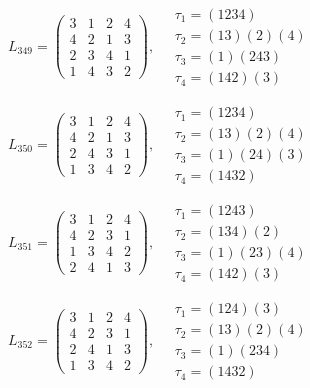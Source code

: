 $L_{349} = \begin{pmatrix} 3 & 1 & 2 & 4 \\ 4 & 2 & 1 & 3 \\ 2 & 3 & 4 & 1 \\ 1 & 4 & 3 & 2 \end{pmatrix}, \quad \begin{matrix} \tau_{1} = (1 2 3 4) \\ \tau_{2} = (1 3)(2)(4) \\ \tau_{3} = (1)(2 4 3) \\ \tau_{4} = (1 4 2)(3) \end{matrix}$

$L_{350} = \begin{pmatrix} 3 & 1 & 2 & 4 \\ 4 & 2 & 1 & 3 \\ 2 & 4 & 3 & 1 \\ 1 & 3 & 4 & 2 \end{pmatrix}, \quad \begin{matrix} \tau_{1} = (1 2 3 4) \\ \tau_{2} = (1 3)(2)(4) \\ \tau_{3} = (1)(2 4)(3) \\ \tau_{4} = (1 4 3 2) \end{matrix}$

$L_{351} = \begin{pmatrix} 3 & 1 & 2 & 4 \\ 4 & 2 & 3 & 1 \\ 1 & 3 & 4 & 2 \\ 2 & 4 & 1 & 3 \end{pmatrix}, \quad \begin{matrix} \tau_{1} = (1 2 4 3) \\ \tau_{2} = (1 3 4)(2) \\ \tau_{3} = (1)(2 3)(4) \\ \tau_{4} = (1 4 2)(3) \end{matrix}$

$L_{352} = \begin{pmatrix} 3 & 1 & 2 & 4 \\ 4 & 2 & 3 & 1 \\ 2 & 4 & 1 & 3 \\ 1 & 3 & 4 & 2 \end{pmatrix}, \quad \begin{matrix} \tau_{1} = (1 2 4)(3) \\ \tau_{2} = (1 3)(2)(4) \\ \tau_{3} = (1)(2 3 4) \\ \tau_{4} = (1 4 3 2) \end{matrix}$

